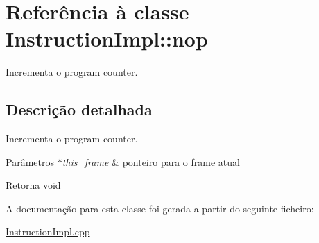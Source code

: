 \hypertarget{class_instruction_impl_1_1nop}{}\section{Referência à classe Instruction\+Impl\+:\+:nop}
\label{class_instruction_impl_1_1nop}


Incrementa o program counter.  




\subsection{Descrição detalhada}
Incrementa o program counter. 


\begin{DoxyParams}{Parâmetros}
{\em $\ast$this\+\_\+frame} & ponteiro para o frame atual \\
\hline
\end{DoxyParams}
\begin{DoxyReturn}{Retorna}
void 
\end{DoxyReturn}


A documentação para esta classe foi gerada a partir do seguinte ficheiro\+:\begin{DoxyCompactItemize}
\item 
\hyperlink{_instruction_impl_8cpp}{Instruction\+Impl.\+cpp}\end{DoxyCompactItemize}
